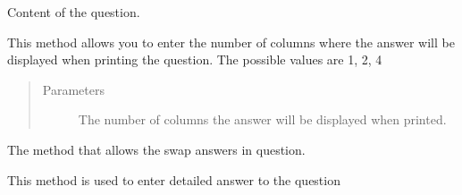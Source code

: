 \documentclass[letterpaper,10pt,english]{sphinxmanual}
\begin{document}
\begin{fulllineitems}

\begin{fulllineitems}
\label{\detokenize{index:pytexexam.question.Question.question}}
Content of the question.

\end{fulllineitems}


\begin{fulllineitems}
\label{\detokenize{index:pytexexam.question.Question.set_answer_column}}
This method allows you to enter the number of columns where the answer will be displayed
when printing the question. The possible values ​​are 1, 2, 4
\begin{quote}\begin{description}
\item[{Parameters}] \leavevmode
{} \textendash{} The number of columns the answer will be displayed when printed.

\end{description}\end{quote}

\end{fulllineitems}


\begin{fulllineitems}
\label{\detokenize{index:pytexexam.question.Question.shuffle_answer}}
The method that allows the swap answers in question.

\end{fulllineitems}


\begin{fulllineitems}
\label{\detokenize{index:pytexexam.question.Question.solution}}
This method is used to enter detailed answer to the question

\end{fulllineitems}


\end{fulllineitems}
\end{document}
